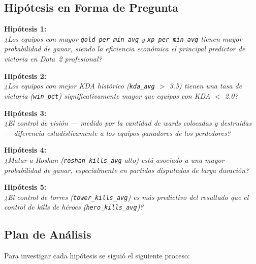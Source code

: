 \documentclass[12pt,a4paper]{article}
\begin{document}
\subsection{Hip\'otesis en Forma de Pregunta}

\textbf{Hip\'otesis 1:}\\
\textit{¿Los equipos con mayor \texttt{gold\_per\_min\_avg} y \texttt{xp\_per\_min\_avg}
tienen mayor probabilidad de ganar, siendo la eficiencia econ\'omica el principal
predictor de victoria en Dota~2 profesional?}

\textbf{Hip\'otesis 2:}\\
\textit{¿Los equipos con mejor KDA hist\'orico (\texttt{kda\_avg} $>$ 3.5) tienen una
tasa de victoria (\texttt{win\_pct}) significativamente mayor que equipos con
KDA $<$ 2.0?}

\textbf{Hip\'otesis 3:}\\
\textit{¿El control de visi\'on --- medido por la cantidad de wards colocadas y
destruidas --- diferencia estad\'isticamente a los equipos ganadores de los perdedores?}

\textbf{Hip\'otesis 4:}\\
\textit{¿Matar a Roshan (\texttt{roshan\_kills\_avg} alto) est\'a asociado a una
mayor probabilidad de ganar, especialmente en partidas disputadas de larga duraci\'on?}

\textbf{Hip\'otesis 5:}\\
\textit{¿El control de torres (\texttt{tower\_kills\_avg}) es m\'as predictivo del
resultado que el control de kills de h\'eroes (\texttt{hero\_kills\_avg})?}

\subsection{Plan de An\'alisis}

Para investigar cada hip\'otesis se sigui\'o el siguiente proceso:
\end{document}

